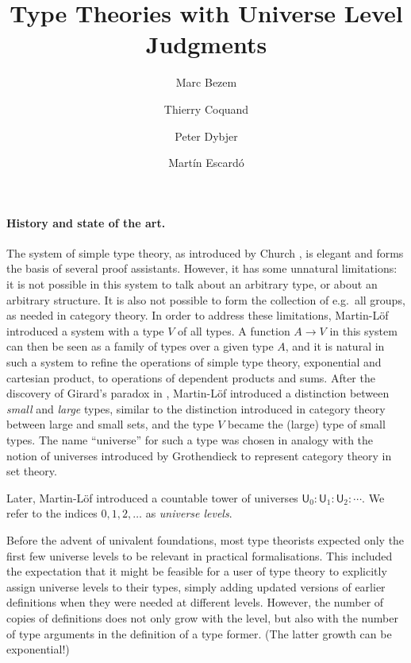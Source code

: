 \documentclass{easychair}
\title{Type Theories with Universe Level Judgments}
\author{
  Marc Bezem\inst{1}
\and
  Thierry Coquand\inst{3}
\and
  Peter Dybjer\inst{3}
\and
  Mart\'in Escard\'o\inst{2}
}
\institute{
  University of Bergen, Norway
\and
  University of Birmingham, United Kingdom
\and
  Chalmers University of Technology,
  Gothenburg, Sweden
}
\def\UU{\mathsf{U}}
\begin{document}
\maketitle



\paragraph{History and state of the art.} 
The system of simple type theory, as introduced by Church \cite{church:formulation},
is elegant and forms the basis of several proof assistants. 
However, it has some unnatural limitations: it is not possible in this system to talk
about an arbitrary type, or about an arbitrary structure. 
It is also not possible to form the collection of e.g.\ all groups, 
as needed in category theory. In order to address these limitations, 
Martin-L\"of \cite{ML71,ML71a} introduced a system with a type $V$ of all types. 
A function $A\rightarrow V$ in this system can then be seen as a family of types 
over a given type $A$, and it is natural in such a system to refine
the operations of simple type theory, exponential and cartesian product, 
to operations of dependent products and sums. 
After the discovery of Girard's paradox in \cite{Girard71}, 
Martin-L\"of \cite{ML72} introduced a distinction between
{\em small} and {\em large} types, similar to the distinction introduced 
in category theory between large and small sets,
and the type $V$ became the (large) type of small types.
The name ``universe'' for such a type was chosen in analogy with the notion of 
universes introduced by Grothendieck to represent category theory in set theory.

Later, Martin-L\"of \cite{martinlof:predicative} introduced a countable tower 
of universes $\UU_0 : \UU_1 : \UU_2 : \cdots$.
We refer to the indices $0, 1, 2, \ldots$ as {\em universe levels}. 

Before the advent of univalent foundations, most type theorists expected only the first few 
universe levels to be relevant in practical formalisations. 
This included the expectation that it might be feasible for a user of type theory to 
explicitly assign universe levels to their types, simply adding updated versions of earlier
definitions when they were needed at different levels.
However, the number of copies of definitions does not only grow with the level, 
but also with the number of type arguments in the definition of a type former. 
(The latter growth can be exponential!)
\end{document}
